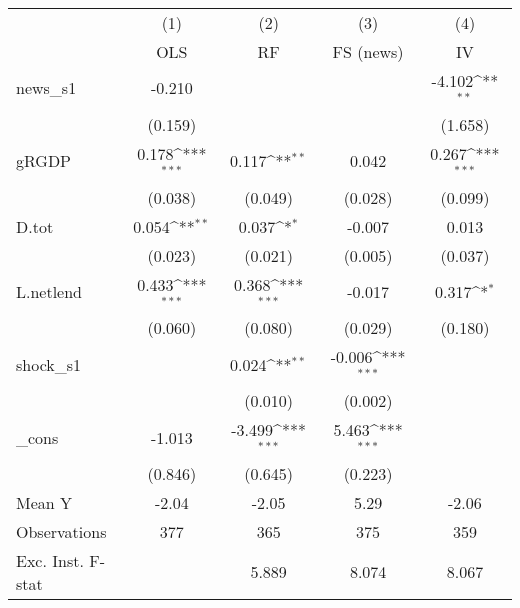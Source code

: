 {
\def\sym#1{\ifmmode^{#1}\else\(^{#1}\)\fi}
\begin{tabular}{l*{4}{c}}
\toprule
            &\multicolumn{1}{c}{(1)}&\multicolumn{1}{c}{(2)}&\multicolumn{1}{c}{(3)}&\multicolumn{1}{c}{(4)}\\
            &\multicolumn{1}{c}{OLS}&\multicolumn{1}{c}{RF}&\multicolumn{1}{c}{FS (news)}&\multicolumn{1}{c}{IV}\\
\midrule
news\_s1     &      -0.210         &                     &                     &      -4.102\sym{**} \\
            &     (0.159)         &                     &                     &     (1.658)         \\
\addlinespace
gRGDP       &       0.178\sym{***}&       0.117\sym{**} &       0.042         &       0.267\sym{***}\\
            &     (0.038)         &     (0.049)         &     (0.028)         &     (0.099)         \\
\addlinespace
D.tot       &       0.054\sym{**} &       0.037\sym{*}  &      -0.007         &       0.013         \\
            &     (0.023)         &     (0.021)         &     (0.005)         &     (0.037)         \\
\addlinespace
L.netlend   &       0.433\sym{***}&       0.368\sym{***}&      -0.017         &       0.317\sym{*}  \\
            &     (0.060)         &     (0.080)         &     (0.029)         &     (0.180)         \\
\addlinespace
shock\_s1    &                     &       0.024\sym{**} &      -0.006\sym{***}&                     \\
            &                     &     (0.010)         &     (0.002)         &                     \\
\addlinespace
\_cons      &      -1.013         &      -3.499\sym{***}&       5.463\sym{***}&                     \\
            &     (0.846)         &     (0.645)         &     (0.223)         &                     \\
\midrule
Mean Y      &       -2.04         &       -2.05         &        5.29         &       -2.06         \\
Observations&         377         &         365         &         375         &         359         \\
Exc. Inst. F-stat&                     &       5.889         &       8.074         &       8.067         \\
\bottomrule
\end{tabular}
}
